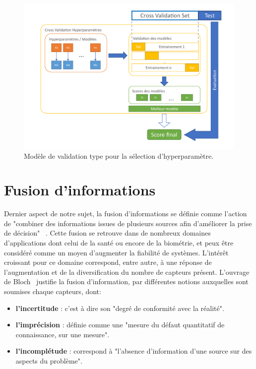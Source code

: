 \begin{figure}[H]
    \centering
    \includegraphics[width=\linewidth]{contents/chapter_3/resources/hyperparameter_process.pdf}
    \caption{Modèle de validation type pour la sélection d’hyperparamètre.}
    \label{fig:hyperparameter_process}
\end{figure}

\section{Fusion d’informations}
Dernier aspect de notre sujet, la fusion d’informations se définie comme l’action de "combiner des informations issues de plusieurs sources afin d’améliorer la prise de décision" ~\cite{Bloch2003}. Cette fusion se retrouve dans de nombreux domaines d'applications dont celui de la santé ou encore de la biométrie, et peux être considéré comme un moyen d'augmenter la fiabilité de systèmes. L'intérêt croissant pour ce domaine correspond, entre autre, à une réponse de l'augmentation et de la diversification du nombre de capteurs présent. L'ouvrage de Bloch~\cite{Bloch2003} justifie la fusion d'information, par différentes notions auxquelles sont soumises chaque capteurs, dont:
\begin{itemize}
    \item \textbf{l'incertitude} : c'est à dire son "degré de conformité avec la réalité".
    \item \textbf{l'imprécision} : définie comme une "mesure du défaut quantitatif de connaissance, sur une mesure".
    \item \textbf{l'incomplétude} : correspond à "l'absence d'information d'une source sur des aspects du problème".
\end{itemize}\par

